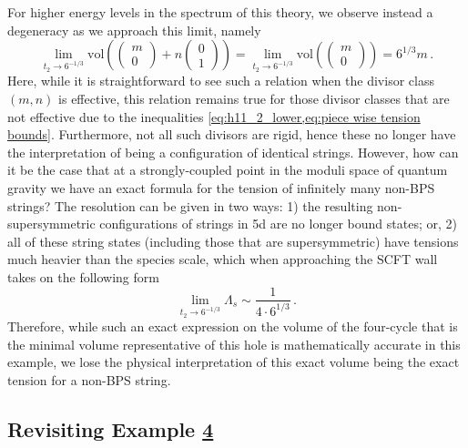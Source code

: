 \documentclass[11pt,dvipsnames]{article}
\theoremstyle{definition}
\begin{document}
For higher energy levels in the spectrum of this theory, we observe instead a degeneracy as we approach this limit, namely
\begin{equation}
    \lim_{t_2\to 6^{-1/3}} \mathrm{vol}\left(\begin{pmatrix}
        m\\
        0
    \end{pmatrix}+n\begin{pmatrix}
        0\\
        1
    \end{pmatrix}\right)=\lim_{t_2\to 6^{-1/3}}\mathrm{vol}\left(\begin{pmatrix}
        m\\
        0
    \end{pmatrix}\right)=6^{1/3}m\,.
\end{equation}
Here, while it is straightforward to see such a relation when the divisor class $(m, n)$ is effective, this relation remains true for those divisor classes that are not effective due to the inequalities \cref{eq:h11_2_lower,eq:piece wise tension bounds}. Furthermore, not all such divisors are rigid, hence these no longer have the interpretation of being a configuration of identical strings. 
However, how can it be the case that at a strongly-coupled point in the moduli space of quantum gravity we have an exact formula for the tension of infinitely many non-BPS strings? The resolution can be given in two ways: 1) the resulting non-supersymmetric configurations of strings in 5d are no longer bound states; 
or, 2) all of these string states (including those that are supersymmetric) have tensions much heavier than the species scale, which when approaching the SCFT wall takes on the following form~\cite{vandeHeisteeg:2023dlw}
\begin{equation}
    \lim_{t_2\to 6^{-1/3}}\Lambda_s\sim \frac{1}{4\cdot 6^{1/3}}\,.
\end{equation}
Therefore, while such an exact expression on the volume of the four-cycle that is the minimal volume representative of this hole is mathematically accurate in this example, we lose the physical interpretation of this exact volume being the exact tension for a non-BPS string.

\subsection{Revisiting Example \hyperref[sec:h11=4]{4}}
\end{document}
